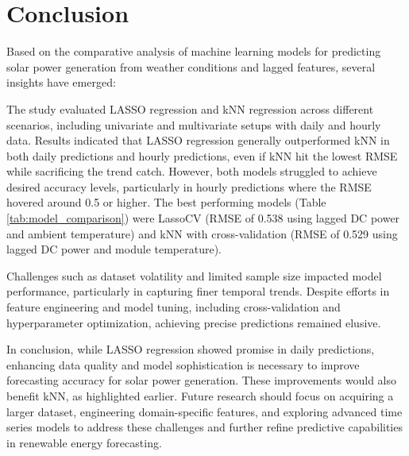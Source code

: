 \section{Conclusion}
Based on the comparative analysis of machine learning models for predicting solar power generation from weather conditions and lagged features, several insights have emerged:

The study evaluated LASSO regression and kNN regression across different scenarios, including univariate and multivariate setups with daily and hourly data. Results indicated that LASSO regression generally outperformed kNN in both daily predictions and hourly predictions, even if kNN hit the lowest RMSE while sacrificing the trend catch. However, both models struggled to achieve desired accuracy levels, particularly in hourly predictions where the RMSE hovered around 0.5 or higher. The best performing models (Table \ref{tab:model_comparison}) were LassoCV (RMSE of 0.538 using lagged DC power and ambient temperature) and kNN with cross-validation (RMSE of 0.529 using lagged DC power and module temperature).

Challenges such as dataset volatility and limited sample size impacted model performance, particularly in capturing finer temporal trends. Despite efforts in feature engineering and model tuning, including cross-validation and hyperparameter optimization, achieving precise predictions remained elusive.

In conclusion, while LASSO regression showed promise in daily predictions, enhancing data quality and model sophistication is necessary to improve forecasting accuracy for solar power generation. These improvements would also benefit kNN, as highlighted earlier. Future research should focus on acquiring a larger dataset, engineering domain-specific features, and exploring advanced time series models to address these challenges and further refine predictive capabilities in renewable energy forecasting.